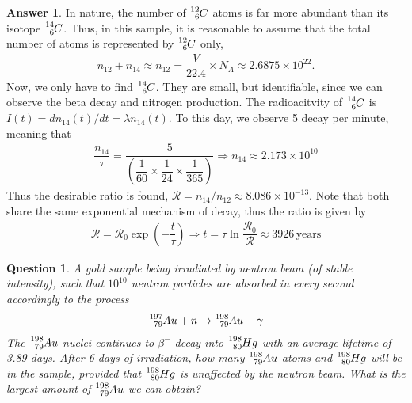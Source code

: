 \documentclass[12pt]{paper}
\numberwithin{equation}{section}
\newtheorem{question}{Question}
\theoremstyle{definition}
\newtheorem*{answer}{Answer}
\numberwithin{equation}{section}
\begin{document}
\begin{answer}
    In nature, the number of $\ce{^12_6}C$ atoms is far more abundant than its isotope $\ce{^14_6}C$. Thus, in this sample, it is reasonable to assume that the total number of atoms is represented by $\ce{^12_6}C$ only, 
    \begin{align} 
        n_{12}+n_{14} \approx n_{12}=\dfrac{V}{22.4}\times N_A \approx 2.6875\times 10^{22}.
    \end{align}
    Now, we only have to find $\ce{^14_6}C$. They are small, but identifiable, since we can observe the beta decay and nitrogen production. The radioacitvity of $\ce{^14_6}C$ is $I(t)=dn_{14}(t)/dt=\lambda n_{14}(t)$. To this day, we observe 5 decay per minute, meaning that 
    \begin{align} 
        \dfrac{n_{14}}{\tau} = \dfrac{5}{\left(\dfrac{1}{60}\times \dfrac{1}{24}\times \dfrac{1}{365}\right)}\Longrightarrow n_{14} \approx 2.173\times 10^{10}
    \end{align}
    Thus the desirable ratio is found, $\mathcal{R}=n_{14}/n_{12}\approx 8.086\times 10^{-13}$. Note that both share the same exponential mechanism of decay, thus the ratio is given by
    \begin{align}
        \mathcal{R} = \mathcal{R}_0\exp\left(-\dfrac{t}{\tau}\right)\Longrightarrow t = \tau\ln\dfrac{\mathcal{R}_0}{\mathcal{R}} \approx 3926\,\text{years}
    \end{align}
\end{answer}
\begin{question}
    A gold sample being irradiated by neutron beam (of stable intensity), such that $10^{10}$ neutron particles are absorbed in every second accordingly to the process 
    \begin{align} 
        \ce{^197_79}Au + n \rightarrow \ce{^198_79}Au + \gamma 
    \end{align}
    The $\ce{^198_79}Au$ nuclei continues to $\beta^-$ decay into $\ce{^198_80}Hg$ with an average lifetime of 3.89 days. After 6 days of irradiation, how many $\ce{^198_79}Au$ atoms and $\ce{^198_80}Hg$ will be in the sample, provided that $\ce{^198_80}Hg$ is unaffected by the neutron beam. What is the largest amount of $\ce{^198_79}Au$ we can obtain?
\end{question}
\end{document}
